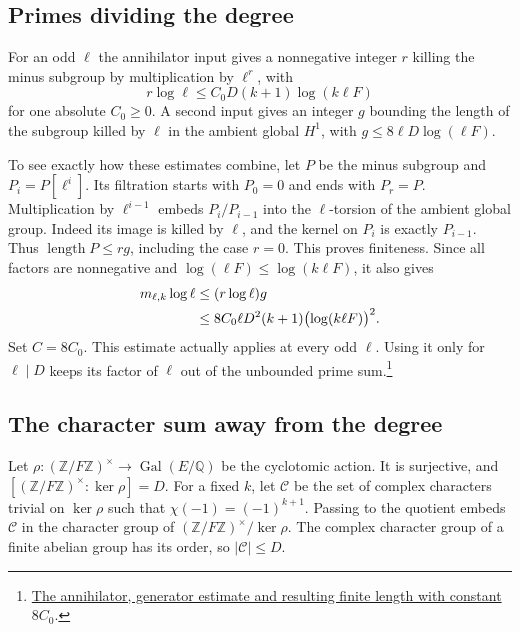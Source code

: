 \subsection{Primes dividing the degree}

For an odd \(\ell\) the annihilator input gives a nonnegative integer
\(r\) killing the minus subgroup by multiplication by \(\ell^r\), with
\[
       r\log\ell\le C_0D(k+1)\log(k\ell F)
\]
for one absolute \(C_0\ge0\). A second input gives an integer \(g\)
bounding the length of the subgroup killed by \(\ell\) in the
ambient global \(H^1\), with \(g\le 8\ell D\log(\ell F)\).

To see exactly how these estimates combine, let \(P\) be the minus
subgroup and \(P_i=P[\ell^i]\). Its filtration starts with \(P_0=0\)
and ends with \(P_r=P\). Multiplication by \(\ell^{i-1}\) embeds
\(P_i/P_{i-1}\) into the \(\ell\)-torsion of the ambient global group.
Indeed its image is killed by \(\ell\), and the kernel on \(P_i\) is
exactly \(P_{i-1}\). Thus \(\operatorname{length}P\le rg\), including
the case \(r=0\). This proves finiteness. Since all factors are
nonnegative and \(\log(\ell F)\le\log(k\ell F)\), it also gives
\begin{align}
 m_{\ell,k}\log\ell
 &\le (r\log\ell)g \notag\\
 &\le 8C_0\ell D^2(k+1)\bigl(\log(k\ell F)\bigr)^2 .
 \label{eq:galois-annihilator-length}
\end{align}
Set \(C=8C_0\). This estimate actually applies at every odd \(\ell\).
Using it only for \(\ell\mid D\) keeps its factor of \(\ell\) out
of the unbounded prime sum.\footnote{\href{https://github.com/Deicyde/riemann-hypothesis/blob/40e56bab/src/Development/AutomorphicArithmetic/AutomorphicVarieties/OddResidueBounds/ThmBcOfPsiBound.lean\#L15-L39}{The annihilator, generator estimate and resulting finite length with constant \(8C_0\)}.}

\subsection{The character sum away from the degree}

Let \(\rho:(\mathbb Z/F\mathbb Z)^\times\to
\operatorname{Gal}(E/\mathbb Q)\) be the cyclotomic action. It is
surjective, and \([\left(\mathbb Z/F\mathbb Z\right)^\times:\ker\rho]=D\).
For a fixed \(k\), let \(\mathcal C\) be the set of complex characters
trivial on \(\ker\rho\) such that \(\chi(-1)=(-1)^{k+1}\).
Passing to the quotient embeds
\(\mathcal C\) in the character group of
\((\mathbb Z/F\mathbb Z)^\times/\ker\rho\). The complex character
group of a finite abelian group has its order, so
\(\lvert\mathcal C\rvert\le D\).

